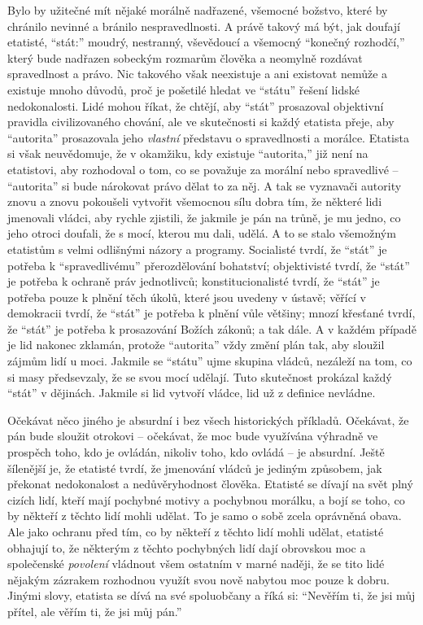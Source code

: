 \documentclass{book}
\begin{document}
Bylo by užitečné mít nějaké morálně nadřazené, všemocné božstvo, které by chránilo nevinné a bránilo nespravedlnosti. A právě takový má být, jak doufají etatisté, \enquote{stát:} moudrý, nestranný, vševědoucí a všemocný \enquote{konečný rozhodčí,} který bude nadřazen sobeckým rozmarům člověka a neomylně rozdávat spravedlnost a právo. Nic takového však neexistuje a ani existovat nemůže a existuje mnoho důvodů, proč je pošetilé hledat ve \enquote{státu} řešení lidské nedokonalosti. Lidé mohou říkat, že chtějí, aby \enquote{stát} prosazoval objektivní pravidla civilizovaného chování, ale ve skutečnosti si každý etatista přeje, aby \enquote{autorita} prosazovala jeho \emph{vlastní} představu o spravedlnosti a morálce. Etatista si však neuvědomuje, že v okamžiku, kdy existuje \enquote{autorita,} již není na etatistovi, aby rozhodoval o tom, co se považuje za morální nebo spravedlivé -- \enquote{autorita} si bude nárokovat právo dělat to za něj. A tak se vyznavači autority znovu a znovu pokoušeli vytvořit všemocnou sílu dobra tím, že některé lidi jmenovali vládci, aby rychle zjistili, že jakmile je pán na trůně, je mu jedno, co jeho otroci doufali, že s mocí, kterou mu dali, udělá. A to se stalo všemožným etatistům s velmi odlišnými názory a programy. Socialisté tvrdí, že \enquote{stát} je potřeba k \enquote{spravedlivému} přerozdělování bohatství; objektivisté tvrdí, že \enquote{stát} je potřeba k ochraně práv jednotlivců; konstitucionalisté tvrdí, že \enquote{stát} je potřeba pouze k plnění těch úkolů, které jsou uvedeny v ústavě; věřící v demokracii tvrdí, že \enquote{stát} je potřeba k plnění vůle většiny; mnozí křesťané tvrdí, že \enquote{stát} je potřeba k prosazování Božích zákonů; a tak dále. A v každém případě je lid nakonec zklamán, protože \enquote{autorita} vždy změní plán tak, aby sloužil zájmům lidí u moci. Jakmile se \enquote{státu} ujme skupina vládců, nezáleží na tom, co si masy předsevzaly, že se svou mocí udělají. Tuto skutečnost prokázal každý \enquote{stát} v dějinách. Jakmile si lid vytvoří vládce, lid už z definice nevládne.

Očekávat něco jiného je absurdní i bez všech historických příkladů. Očekávat, že pán bude sloužit otrokovi -- očekávat, že moc bude využívána výhradně ve prospěch toho, kdo je ovládán, nikoliv toho, kdo ovládá -- je absurdní. Ještě šílenější je, že etatisté tvrdí, že jmenování vládců je jediným způsobem, jak překonat nedokonalost a nedůvěryhodnost člověka. Etatisté se dívají na svět plný cizích lidí, kteří mají pochybné motivy a pochybnou morálku, a bojí se toho, co by někteří z těchto lidí mohli udělat. To je samo o sobě zcela oprávněná obava. Ale jako ochranu před tím, co by někteří z těchto lidí mohli udělat, etatisté obhajují to, že některým z těchto pochybných lidí dají obrovskou moc a společenské \emph{povolení} vládnout všem ostatním v marné naději, že se tito lidé nějakým zázrakem rozhodnou využít svou nově nabytou moc pouze k dobru. Jinými slovy, etatista se dívá na své spoluobčany a říká si: \enquote{Nevěřím ti, že jsi můj přítel, ale věřím ti, že jsi můj pán.}
\end{document}
